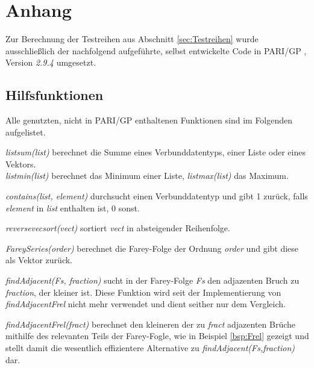 \section{Anhang}\label{sec:code}

Zur Berechnung der Testreihen aus Abschnitt \ref{sec:Testreihen} wurde ausschließlich der nachfolgend aufgeführte, selbst entwickelte Code in PARI/GP \cite{PARI2018}, Version \emph{2.9.4} umgesetzt.

\subsection{Hilfsfunktionen}
Alle genutzten, nicht in PARI/GP enthaltenen Funktionen sind im Folgenden aufgelistet.

\emph{listsum(list)} berechnet die Summe eines Verbunddatentyps, \bspw einer Liste oder eines Vektors.\\ \emph{listmin(list)} berechnet das Minimum einer Liste, \emph{listmax(list)} das Maximum.


\emph{contains(list, element)} durchsucht einen Verbunddatentyp und gibt 1 zurück, falls \emph{element} in \emph{list} enthalten ist, 0 sonst.


\emph{reversevecsort(vect)} sortiert \emph{vect} in absteigender Reihenfolge.


\emph{FareySeries(order)} berechnet die Farey-Folge der Ordnung \emph{order} und gibt diese als Vektor zurück.


\emph{findAdjacent(Fs, fraction)} sucht in der Farey-Folge \emph{Fs} den adjazenten Bruch zu \emph{fraction}, der kleiner ist. Diese Funktion wird seit der Implementierung von \emph{findAdjacentFrel} nicht mehr verwendet und dient seither nur dem Vergleich.


\emph{findAdjacentFrel(fract)} berechnet den kleineren der zu \emph{fract} adjazenten Brüche mithilfe des relevanten Teils der Farey-Fogle, wie in Beispiel \ref{bsp:Frel} gezeigt und stellt damit die wesentlich effizientere Alternative zu \emph{findAdjacent(Fs,fraction)} dar.


